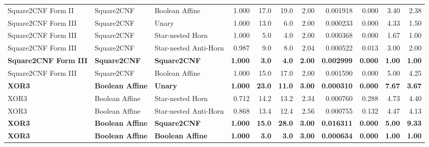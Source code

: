\begin{tabular}{lllrrrrrrrr}
Square2CNF Form II & Square2CNF & Boolean Affine & 1.000 & 17.0 & 19.0 & 2.00 & 0.001918 & 0.000 & 3.40 & 2.38 \\
Square2CNF Form III & Square2CNF & Unary & 1.000 & 13.0 & 6.0 & 2.00 & 0.000233 & 0.000 & 4.33 & 1.50 \\
Square2CNF Form III & Square2CNF & Star-nested Horn & 1.000 & 5.0 & 4.0 & 2.00 & 0.000368 & 0.000 & 1.67 & 1.00 \\
Square2CNF Form III & Square2CNF & Star-nested Anti-Horn & 0.987 & 9.0 & 8.0 & 2.04 & 0.000522 & 0.013 & 3.00 & 2.00 \\
\textbf{Square2CNF Form III} & \textbf{Square2CNF} & \textbf{Square2CNF} & \textbf{1.000} & \textbf{3.0} & \textbf{4.0} & \textbf{2.00} & \textbf{0.002999} & \textbf{0.000} & \textbf{1.00} & \textbf{1.00} \\
Square2CNF Form III & Square2CNF & Boolean Affine & 1.000 & 15.0 & 17.0 & 2.00 & 0.001590 & 0.000 & 5.00 & 4.25 \\
\textbf{XOR3} & \textbf{Boolean Affine} & \textbf{Unary} & \textbf{1.000} & \textbf{23.0} & \textbf{11.0} & \textbf{3.00} & \textbf{0.000310} & \textbf{0.000} & \textbf{7.67} & \textbf{3.67} \\
XOR3 & Boolean Affine & Star-nested Horn & 0.712 & 14.2 & 13.2 & 2.34 & 0.000760 & 0.288 & 4.73 & 4.40 \\
XOR3 & Boolean Affine & Star-nested Anti-Horn & 0.868 & 13.4 & 12.4 & 2.56 & 0.000755 & 0.132 & 4.47 & 4.13 \\
\textbf{XOR3} & \textbf{Boolean Affine} & \textbf{Square2CNF} & \textbf{1.000} & \textbf{15.0} & \textbf{28.0} & \textbf{3.00} & \textbf{0.016311} & \textbf{0.000} & \textbf{5.00} & \textbf{9.33} \\
\textbf{XOR3} & \textbf{Boolean Affine} & \textbf{Boolean Affine} & \textbf{1.000} & \textbf{3.0} & \textbf{3.0} & \textbf{3.00} & \textbf{0.000634} & \textbf{0.000} & \textbf{1.00} & \textbf{1.00} \\
\bottomrule
\end{tabular}
